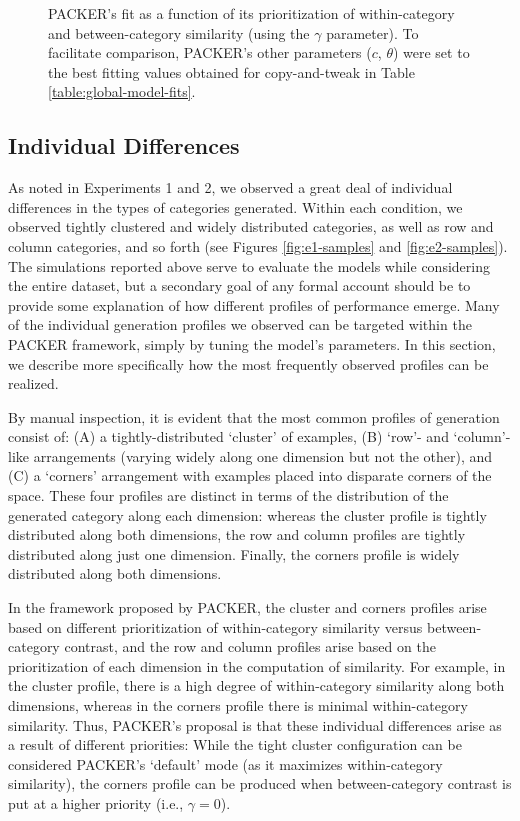 \documentclass[12pt]{article}
\newcommand\inputpgf[2]{{
\let\pgfimageWithoutPath\pgfimage
\renewcommand{\pgfimage}[2][]{\pgfimageWithoutPath[##1]{#1/##2}}

}}
\begin{document}
\begin{flushleft}
\begin{figure}
    \begin{center}
    \inputpgf{figs/}{packer-loglike.pgf}
    \caption{PACKER's fit as a function of its prioritization of within-category and between-category similarity (using the $\gamma$ parameter). To facilitate comparison, PACKER's other parameters ($c$, $\theta$) were set to the best fitting values obtained for copy-and-tweak in Table \ref{table:global-model-fits}. }
    \label{fig:packer-loglike}
    \end{center}
\end{figure}


\subsection{Individual Differences}
\label{section:individual-diffs}

As noted in Experiments 1 and 2, we observed a great deal of individual differences in the types of categories generated. Within each condition, we observed tightly clustered and widely distributed categories, as well as row and column categories, and so forth (see Figures \ref{fig:e1-samples} and \ref{fig:e2-samples}). The simulations reported above serve to evaluate the models while considering the entire dataset, but a secondary goal of any formal account should be to provide some explanation of how different profiles of performance emerge. Many of the individual generation profiles we observed can be targeted within the PACKER framework, simply by tuning the model's parameters. In this section, we describe more specifically how the most frequently observed profiles can be realized.

By manual inspection, it is evident that the most common profiles of generation consist of: (A) a tightly-distributed `cluster' of examples, (B) `row'- and `column'-like arrangements (varying widely along one dimension but not the other), and (C) a `corners' arrangement with examples placed into disparate corners of the space. These four profiles are distinct in terms of the distribution of the generated category along each dimension: whereas the cluster profile is tightly distributed along both dimensions, the row and column profiles are tightly distributed along just one dimension. Finally, the corners profile is widely distributed along both dimensions.

In the framework proposed by PACKER, the cluster and corners profiles arise based on different prioritization of within-category similarity versus between-category contrast, and the row and column profiles arise based on the prioritization of each dimension in the computation of similarity. For example, in the cluster profile, there is a high degree of within-category similarity along both dimensions, whereas in the corners profile there is minimal within-category similarity. Thus, PACKER's proposal is that these individual differences arise as a result of different priorities: While the tight cluster configuration can be considered PACKER's `default' mode (as it maximizes within-category similarity), the corners profile can be produced when between-category contrast is put at a higher priority (i.e., $\gamma = 0$).


\end{flushleft}
\end{document}
